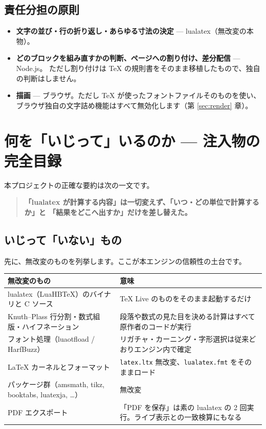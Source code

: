 \documentclass[11pt,a4paper]{ltjsarticle}
\newcommand{\code}[1]{\texttt{#1}}
\begin{document}
\subsection{責任分担の原則}

\begin{itemize}
\item \textbf{文字の並び・行の折り返し・あらゆる寸法の決定} --- lualatex（無改変の本物）。
\item \textbf{どのブロックを組み直すかの判断、ページへの割り付け、差分配信} --- Node.js。
  ただし割り付けは TeX の規則書をそのまま移植したもので、独自の判断はしません。
\item \textbf{描画} --- ブラウザ。ただし TeX が使ったフォントファイルそのものを使い、
  ブラウザ独自の文字詰め機能はすべて無効化します（第 \ref{sec:render} 章）。
\end{itemize}

\section{何を「いじって」いるのか --- 注入物の完全目録}
\label{sec:injections}

本プロジェクトの正確な要約は次の一文です。

\begin{quote}
\textbf{「lualatex が計算する内容」は一切変えず、「いつ・どの単位で計算するか」と
「結果をどこへ出すか」だけを差し替えた。}
\end{quote}

\subsection{いじって「いない」もの}

先に、無改変のものを列挙します。ここが本エンジンの信頼性の土台です。

\begin{center}
\begin{tabular}{p{}p{}}
\toprule
無改変のもの & 意味 \\
\midrule
lualatex（LuaHBTeX）のバイナリと C ソース & TeX Live のものをそのまま起動するだけ \\
Knuth--Plass 行分割・数式組版・ハイフネーション & 段落や数式の見た目を決める計算はすべて原作者のコードが実行 \\
フォント処理（luaotfload / HarfBuzz） & リガチャ・カーニング・字形選択は従来どおりエンジン内で確定 \\
LaTeX カーネルとフォーマット & \code{latex.ltx} 無改変、\code{lualatex.fmt} をそのままロード \\
パッケージ群（amsmath, tikz, booktabs, luatexja, \ldots） & 無改変 \\
PDF エクスポート & 「PDF を保存」は素の lualatex の 2 回実行。ライブ表示との一致検算にもなる \\
\bottomrule
\end{tabular}
\end{center}
\end{document}

